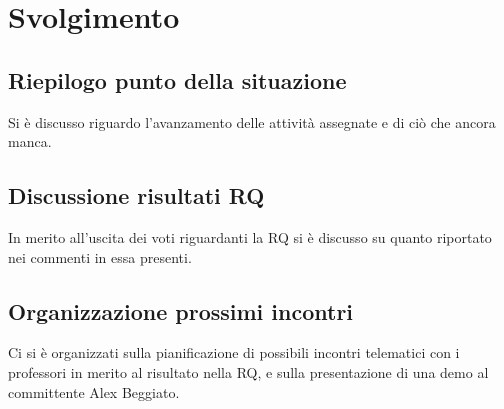 \newpage
\section*{Svolgimento}

	\subsection*{Riepilogo punto della situazione}
		Si è discusso riguardo l'avanzamento delle attività assegnate e di ciò che ancora manca.

	\subsection*{Discussione risultati RQ}
		In merito all'uscita dei voti riguardanti la RQ si è discusso su quanto riportato nei commenti in essa presenti.

	\subsection*{Organizzazione prossimi incontri}
		Ci si è organizzati sulla pianificazione di possibili incontri telematici con i professori in merito al risultato nella RQ, e sulla presentazione di una demo al committente Alex Beggiato.
